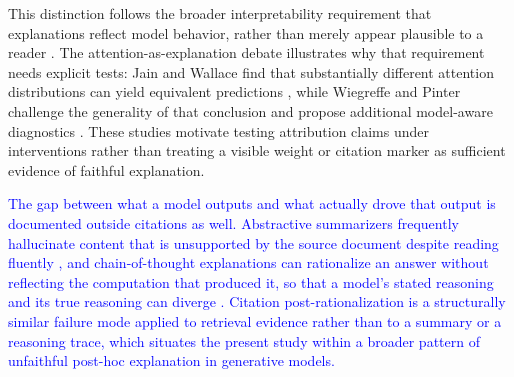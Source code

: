\documentclass[a4paper,fleqn]{cas-sc}
\begin{document}
This distinction follows the broader interpretability requirement that explanations reflect model behavior, rather than merely appear plausible to a reader \cite{jacovi2020faithful}. The attention-as-explanation debate illustrates why that requirement needs explicit tests: Jain and Wallace find that substantially different attention distributions can yield equivalent predictions \cite{jain2019attention}, while Wiegreffe and Pinter challenge the generality of that conclusion and propose additional model-aware diagnostics \cite{wiegreffe2019attention}. These studies motivate testing attribution claims under interventions rather than treating a visible weight or citation marker as sufficient evidence of faithful explanation.

\textcolor{blue}{The gap between what a model outputs and what actually drove that output is documented outside citations as well. Abstractive summarizers frequently hallucinate content that is unsupported by the source document despite reading fluently \cite{maynez2020faithfulness}, and chain-of-thought explanations can rationalize an answer without reflecting the computation that produced it, so that a model's stated reasoning and its true reasoning can diverge \cite{turpin2023unfaithful}. Citation post-rationalization is a structurally similar failure mode applied to retrieval evidence rather than to a summary or a reasoning trace, which situates the present study within a broader pattern of unfaithful post-hoc explanation in generative models.}
\end{document}
